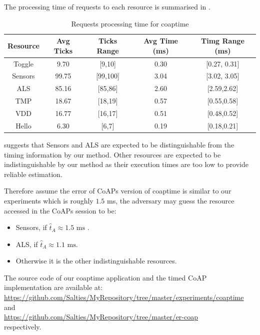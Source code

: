 The processing time of requests to each resource is summarised in .

\begin{table}[ht!]
	\center
	\begin{tabular}{|c|c|c|c|c|}
		\hline
		Resource & Avg Ticks & Ticks Range & Avg Time (ms) & Timg Range (ms)\\ \hline
		Toggle   & 9.70	&[9,10]                          & 0.30	&	[0.27, 0.31]                 \\ \hline
		Sensors  & 99.75	&[99,100]                         & 3.04	&	[3.02, 3.05]                \\ \hline
		ALS      & 85.16	&[85,86]                         & 2.60	&	[2.59,2.62]                 \\ \hline
		TMP      & 18.67	&[18,19]                         & 0.57	&	[0.55,0.58]             \\ \hline
		VDD      & 16.77	&[16,17]                         & 0.51	&	[0.48,0.52]                 \\ \hline
		Hello    & 6.30	&[6,7]                          & 0.19	&[0.18,0.21]                 \\ \hline
	\end{tabular}
	\caption{Requests processing time for coaptime}
	\label{Tbl: Requests processing time for coaptime}
\end{table}

 suggests that Sensors and ALS are expected to be distinguishable from the timing information by our method. Other resources are expected to be indistinguishable by our method as their execution times are too low to provide reliable estimation.

Therefore assume the error of CoAPs version of coaptime is similar to our experiments which is roughly $1.5$ ms, the adversary may guess the resource accessed in the CoAPs session to be:
\begin{itemize}
	\item Sensors, if $\hat{t}_A \approx 1.5 \text{ ms}$ .
	\item ALS, if $\hat{t}_A \approx 1.1 \text{ ms}$.
	\item Otherwise it is the other indistinguishable resources.
\end{itemize}

The source code of our coaptime application and the timed CoAP implementation are available at: \\
\url{https://github.com/Salties/MyRepository/tree/master/experiments/coaptime}\\
and \\
\url{https://github.com/Salties/MyRepository/tree/master/er-coap} \\
respectively.

